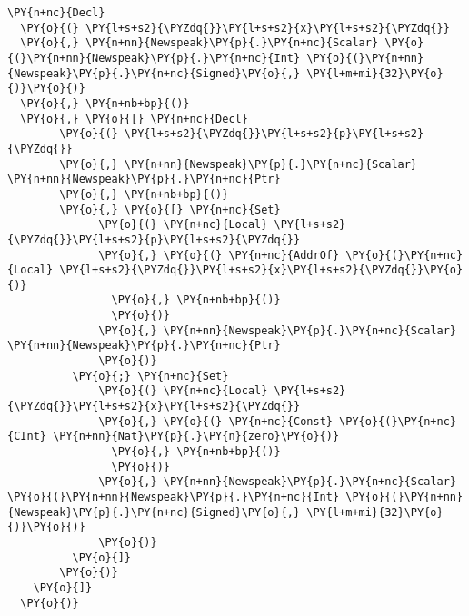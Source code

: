 \begin{Verbatim}[commandchars=\\\{\}]
\PY{n+nc}{Decl}
  \PY{o}{(} \PY{l+s+s2}{\PYZdq{}}\PY{l+s+s2}{x}\PY{l+s+s2}{\PYZdq{}}
  \PY{o}{,} \PY{n+nn}{Newspeak}\PY{p}{.}\PY{n+nc}{Scalar} \PY{o}{(}\PY{n+nn}{Newspeak}\PY{p}{.}\PY{n+nc}{Int} \PY{o}{(}\PY{n+nn}{Newspeak}\PY{p}{.}\PY{n+nc}{Signed}\PY{o}{,} \PY{l+m+mi}{32}\PY{o}{)}\PY{o}{)}
  \PY{o}{,} \PY{n+nb+bp}{()}
  \PY{o}{,} \PY{o}{[} \PY{n+nc}{Decl}
        \PY{o}{(} \PY{l+s+s2}{\PYZdq{}}\PY{l+s+s2}{p}\PY{l+s+s2}{\PYZdq{}}
        \PY{o}{,} \PY{n+nn}{Newspeak}\PY{p}{.}\PY{n+nc}{Scalar} \PY{n+nn}{Newspeak}\PY{p}{.}\PY{n+nc}{Ptr}
        \PY{o}{,} \PY{n+nb+bp}{()}
        \PY{o}{,} \PY{o}{[} \PY{n+nc}{Set}
              \PY{o}{(} \PY{n+nc}{Local} \PY{l+s+s2}{\PYZdq{}}\PY{l+s+s2}{p}\PY{l+s+s2}{\PYZdq{}}
              \PY{o}{,} \PY{o}{(} \PY{n+nc}{AddrOf} \PY{o}{(}\PY{n+nc}{Local} \PY{l+s+s2}{\PYZdq{}}\PY{l+s+s2}{x}\PY{l+s+s2}{\PYZdq{}}\PY{o}{)}
                \PY{o}{,} \PY{n+nb+bp}{()}
                \PY{o}{)}
              \PY{o}{,} \PY{n+nn}{Newspeak}\PY{p}{.}\PY{n+nc}{Scalar} \PY{n+nn}{Newspeak}\PY{p}{.}\PY{n+nc}{Ptr}
              \PY{o}{)}
          \PY{o}{;} \PY{n+nc}{Set}
              \PY{o}{(} \PY{n+nc}{Local} \PY{l+s+s2}{\PYZdq{}}\PY{l+s+s2}{x}\PY{l+s+s2}{\PYZdq{}}
              \PY{o}{,} \PY{o}{(} \PY{n+nc}{Const} \PY{o}{(}\PY{n+nc}{CInt} \PY{n+nn}{Nat}\PY{p}{.}\PY{n}{zero}\PY{o}{)}
                \PY{o}{,} \PY{n+nb+bp}{()}
                \PY{o}{)}
              \PY{o}{,} \PY{n+nn}{Newspeak}\PY{p}{.}\PY{n+nc}{Scalar} \PY{o}{(}\PY{n+nn}{Newspeak}\PY{p}{.}\PY{n+nc}{Int} \PY{o}{(}\PY{n+nn}{Newspeak}\PY{p}{.}\PY{n+nc}{Signed}\PY{o}{,} \PY{l+m+mi}{32}\PY{o}{)}\PY{o}{)}
              \PY{o}{)}
          \PY{o}{]}
        \PY{o}{)}
    \PY{o}{]}
  \PY{o}{)}
\end{Verbatim}
